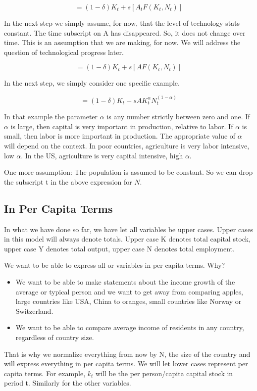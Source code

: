 \documentclass[
]{book}
\providecommand{\tightlist}{%
  \setlength{\itemsep}{0pt}\setlength{\parskip}{0pt}}
\begin{document}
\[=(1-δ) K_t+s[A_t F (K_t,N_t)]\]

In the next step we simply assume, for now, that the level of technology stats constant. The time subscript on A has disappeared. So, it does not change over time. This is an assumption that we are making, for now. We will address the question of technological progress later.

\[=(1-δ) K_t+s[A F (K_t,N_t)]\]

In the next step, we simply consider one specific example.

\[=(1-δ) K_t+s A K_t^\alpha N_t^{(1-\alpha)}\]

In that example the parameter \(\alpha\) is any number strictly between zero and one. If \(\alpha\) is large, then capital is very important in production, relative to labor. If \(\alpha\) is small, then labor is more important in production. The appropriate value of \(\alpha\) will depend on the context. In poor countries, agriculture is very labor intensive, low \(\alpha\). In the US, agriculture is very capital intensive, high \(\alpha\).

One more assumption: The population is assumed to be constant. So we can drop the subscript t in the above expression for \(N\).

\hypertarget{in-per-capita-terms}{%
\subsection{In Per Capita Terms}\label{in-per-capita-terms}}

In what we have done so far, we have let all variables be upper cases. Upper cases in this model will always denote totals. Upper case K denotes total capital stock, upper case Y denotes total output, upper case N denotes total employment.

We want to be able to express all or variables in per capita terms. Why?

\begin{itemize}
\tightlist
\item
  We want to be able to make statements about the income growth of the average or typical person and we want to get away from comparing apples, large countries like USA, China to oranges, small countries like Norway or Switzerland.
\item
  We want to be able to compare average income of residents in any country, regardless of country size.
\end{itemize}

That is why we normalize everything from now by N, the size of the country and will express everything in per capita terms. We will let lower cases represent per capita terms. For example, \(k_t\) will be the per person/capita capital stock in period t. Similarly for the other variables.
\end{document}
